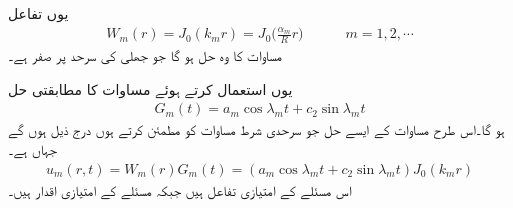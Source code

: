 یوں تفاعل
\begin{align}\label{مساوات_جزوی_دائری_حل_پ}
W_m(r)=J_0(k_mr)=J_0\big(\frac{\alpha_m}{R}r\big)\quad \quad \quad m=1,2,\cdots
\end{align}
مساوات  کا وہ حل ہو گا جو جھلی کی سرحد پر صفر ہے۔

یوں  استعمال کرتے ہوئے مساوات  کا مطابقتی حل
\begin{align*}
G_m(t)=a_m\cos \lambda_mt+c_2\sin \lambda_mt
\end{align*}
ہو گا۔اس طرح مساوات  کے ایسے حل جو سرحدی شرط مساوات  کو مطمئن کرتے ہوں درج ذیل ہوں گے جہاں  ہے۔
\begin{align}\label{مساوات_جزوی_دائری_حل_ت}
u_m(r,t)=W_m(r)G_m(t)=(a_m\cos \lambda_mt+c_2\sin \lambda_mt)J_0(k_mr)
\end{align}
 اس مسئلے کے امتیازی تفاعل ہیں جبکہ  مسئلے کے امتیازی اقدار ہیں۔


